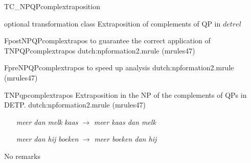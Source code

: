 \begin{mruleclass}{TC\_NPQPcomplextraposition}
\begin{classdescr}
\kind optional transformation class
\classtask Extraposition of complements of QP in $detrel$
\classremarks
\begin{filters}

\begin{members}
\begin{member}
 FpostNPQPcomplextrapos
 to guarantee the correct application of TNPQPcomplextrapos
\file dutch:npformation2.mrule (mrules47)
\end{member}
\end{members}
\end{filters}
\begin{speedrules}
\begin{members}
\begin{member}
 FpreNPQPcomplextrapos
 to speed up analysis
\file dutch:npformation2.mrule (mrules47)
\end{member}
\end{members}
\end{speedrules}

\noplannedrules

\norulesnotince


\end{classdescr}

\begin{members}

\begin{member}
 TNPqpcomplextrapos
 Extraposition in the NP of the complements of QPs in 
DETP.
\file dutch:npformation2.mrule (mrules47)
\semantics \nosemantics
\example\mbox{}
\begin{enumerate}
  \item 
[{\em meer dan melk}] {\em kaas}
$\rightarrow$
{\em meer kaas dan melk}
  \item
[{\em meer dan hij}] {\em boeken}
$\rightarrow$
{\em meer boeken dan hij}
\end{enumerate}
\remarks No remarks
\end{member}
\end{members}
\end{mruleclass}
